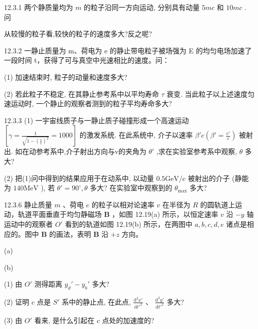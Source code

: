 \begin{problem}{12.3.1}
两个静质量均为 $m$ 的粒子沿同一方向运动, 分别具有动量 $5mc$ 和 $10mc$ . 问

从较慢的粒子看,较快的粒子的速度多大?反之呢?
\end{problem}
\clearpage


\begin{problem}{12.3.2}
一静止质量为 m、荷电为 e 的静止带电粒子被场强为 E 的均匀电场加速了一段时间 t，获得了可与真空中光速相比的速度。问：

(1) 加速结束时, 粒子的动量和速度多大?

(2) 若此粒子不稳定, 在其静止参考系中以平均寿命 $\tau$ 衰变. 当此粒子以上述速度匀速运动时, 一个静止的观察者测到的粒子平均寿命多大?
\end{problem}
\clearpage


\begin{problem}{12.3.3}
(1) 一宇宙线质子与一静止质子碰撞形成一个高速运动 $\left[\gamma = \frac{1}{\sqrt{1 - \left(\frac{v}{c}\right)^2}} = 1000\right]$ 的激发系统. 在此系统中, 介子以速率 $\beta' c\left(\beta' = \frac{v'}{c}\right)$ 被射出. 如在动参考系中,介子射出方向与v的夹角为 $\theta'$ ,求在实验室参考系中观察, $\theta$ 多大?

(2) 把(1)问中得到的结果应用于在动系中, 以动量 $0.5\mathrm{GeV} / \mathrm{c}$ 被射出的介子 (静能为 $140\mathrm{MeV}$ ), 若 $\theta' = 90^{\circ}, \theta$ 多大? 在实验室中观察到的 $\theta_{\max}$ 多大?
\end{problem}
\clearpage


\begin{problem}{12.3.6}
静止质量 $m$ 、荷电 $e$ 的粒子以相对论速率 $v$ 在半径为 $R$ 的圆轨道上运动，轨道平面垂直于均匀静磁场 $\bm{B}$ ，如图 12.19(a) 所示，以恒定速率 $v$ 沿 $-y$ 轴运动中的观察者 $O'$ 看到的轨道如图 12.19(b) 所示，在两图中 $a, b, c, d, e$ 诸点是相应的。图中 $\bm{B}$ 的画法，表明 $\bm{B}$ 沿 $+z$ 方向。

(a)

(b)

(1) 由 $O'$ 测得距离 $y_d' - y_b'$ 多大?

(2) 证明 $c$ 点是 $S'$ 系中的静止点, 在此点, $\frac{\mathrm{d}^2 x'}{\mathrm{d} t'^2}$ 、 $\frac{\mathrm{d}^2 y'}{\mathrm{d} t'^2}$ 多大?

(3) 由 $O'$ 看来, 是什么引起在 $c$ 点处的加速度的?
\begin{center}

\end{center}
\begin{center}

\end{center}
\end{problem}
\clearpage


